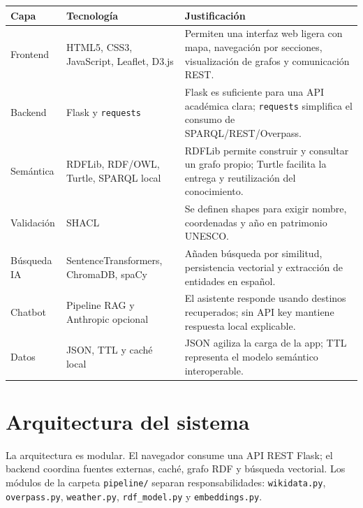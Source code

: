\documentclass[10pt,a4paper]{article}
\newcommand{\separaseccion}{\vspace{0.65\baselineskip}}
\begin{document}
\begin{table}[H]
\centering
\small
\begin{tabularx}{\textwidth}{p{3cm}p{3.1cm}X}
\toprule
\textbf{Capa} & \textbf{Tecnología} & \textbf{Justificación}\\
\midrule
Frontend & HTML5, CSS3, JavaScript, Leaflet, D3.js & Permiten una interfaz web ligera con mapa, navegación por secciones, visualización de grafos y comunicación REST.\\
Backend & Flask y \texttt{requests} & Flask es suficiente para una API académica clara; \texttt{requests} simplifica el consumo de SPARQL/REST/Overpass.\\
Semántica & RDFLib, RDF/OWL, Turtle, SPARQL local & RDFLib permite construir y consultar un grafo propio; Turtle facilita la entrega y reutilización del conocimiento.\\
Validación & SHACL & Se definen shapes para exigir nombre, coordenadas y año en patrimonio UNESCO.\\
Búsqueda IA & SentenceTransformers, ChromaDB, spaCy & Añaden búsqueda por similitud, persistencia vectorial y extracción de entidades en español.\\
Chatbot & Pipeline RAG y Anthropic opcional & El asistente responde usando destinos recuperados; sin API key mantiene respuesta local explicable.\\
Datos & JSON, TTL y caché local & JSON agiliza la carga de la app; TTL representa el modelo semántico interoperable.\\
\bottomrule
\end{tabularx}
\end{table}

\separaseccion{}
\section{Arquitectura del sistema}

La arquitectura es modular. El navegador consume una API REST Flask; el backend coordina fuentes externas, caché, grafo RDF y búsqueda vectorial. Los módulos de la carpeta \texttt{pipeline/} separan responsabilidades: \texttt{wikidata.py}, \texttt{overpass.py}, \texttt{weather.py}, \texttt{rdf\_model.py} y \texttt{embeddings.py}.
\end{document}
